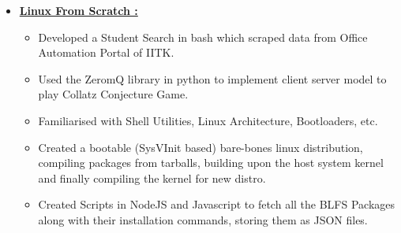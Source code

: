 
{\fontsize{11pt}{1em}\bodyfontlight\upshape\color{text}
	\begin{itemize}
		\item \href{https://github.com/mayanksha/LFS-Scripts}{\textbf{Linux From Scratch \ExternalLink : }}  
			\begin{itemize}
				\item Developed a Student Search in bash which scraped data from Office Automation Portal of IITK. 
				\item Used the ZeromQ library in python to implement client server model to play Collatz Conjecture Game.
				\item Familiarised with Shell Utilities, Linux Architecture, Bootloaders, etc.
				\item Created a bootable (SysVInit based) bare-bones linux distribution, compiling packages from tarballs, building upon the host system kernel and finally compiling the kernel for new distro.
				\item Created Scripts in NodeJS and Javascript to fetch all the BLFS Packages along with their installation commands, storing them as JSON files. 
			\end{itemize}
	\end{itemize}
}
